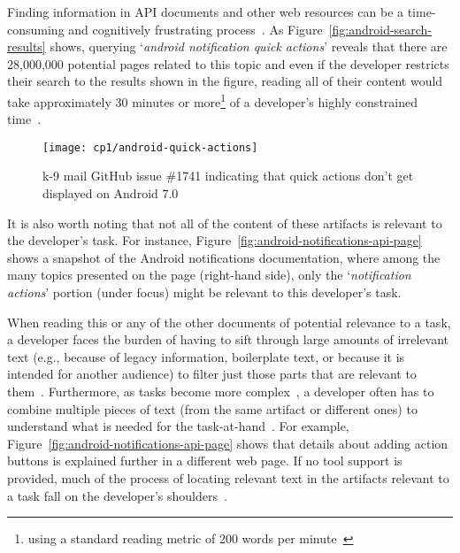 



Finding information in API documents and other web resources can be a time-consuming
and cognitively frustrating process~\cite{Begel2008,
robillard2011field}. 
As Figure~\ref{fig:android-search-results} shows, querying `\textit{android notification quick actions}'
reveals that there are 28,000,000 potential pages related to this topic
and even if the developer restricts their search to the results shown in the figure, reading all of their content would take approximately 30 minutes or more\footnote{using a standard reading metric of 200 words per minute~\cite{Just1980}} of a developer's highly constrained time~\cite{endrikat2014, Meyer2017}. 


\begin{figure}
    \centering
    \texttt{[image: cp1/android-quick-actions]}
    \caption{k-9 mail GitHub issue \#1741 indicating that quick actions don't get displayed on Android 7.0}
    \label{fig:android-notifications-task}
\end{figure}



It is also worth noting that not all of the content of these artifacts is relevant to the developer's task. 
For instance, Figure~\ref{fig:android-notifications-api-page} shows a snapshot 
of the Android notifications documentation, where among  
the many topics presented on the page (right-hand side), only the `\textit{notification actions}' portion (under focus) might be relevant to this developer's task. 


When reading this or any of the other documents of potential relevance to a task, a developer 
faces the burden of having to sift through large amounts of
irrelevant text (e.g., because of legacy information, boilerplate text, or because it is intended for another audience) to filter just those parts that are relevant to them~\cite{Robillard2015}. 
Furthermore, as tasks become more complex~\cite{Pirolli2007, Bystrom1995}, a developer often has to combine multiple pieces of text (from the same artifact or different ones) to understand what is needed for the task-at-hand~\cite{Piorkowski2016}. For example, Figure~\ref{fig:android-notifications-api-page} shows that details about adding
action buttons is explained further in a different web page.
If no tool support is provided, much of the process of locating relevant text in the 
artifacts relevant to a task fall on the developer's shoulders~\cite{gonccalves2011, Ko2006a, Bystrom1995}.


